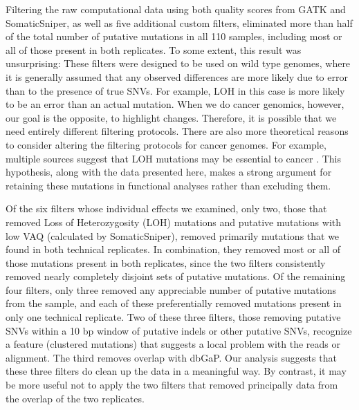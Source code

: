 \documentclass[11 pt]{article} %
\begin{document}
Filtering the raw computational data using both quality scores from GATK and SomaticSniper, as well as five additional custom filters, eliminated more than half of the total number of putative mutations in all 110 samples, including most or all of those present in both replicates. To some extent, this result was unsurprising: These filters were designed to be used on wild type genomes, where it is generally assumed that any observed differences are more likely due to error than to the presence of true SNVs. For example, LOH in this case is more likely to be an error than an actual mutation. When we do cancer genomics, however, our goal is the opposite, to highlight changes. Therefore, it is possible that we need entirely different filtering protocols. There are also more theoretical reasons to consider altering the filtering protocols for cancer genomes. For example, multiple sources suggest that LOH mutations may be essential to cancer \citep{LOH}. This hypothesis, along with the data presented here, makes a strong argument for retaining these mutations in functional analyses rather than excluding them.

Of the six filters whose individual effects we examined, only two, those that removed Loss of Heterozygosity (LOH) mutations and putative mutations with low VAQ (calculated by SomaticSniper), removed primarily mutations that we found in both technical replicates. In combination, they removed most or all of those mutations present in both replicates, since the two filters consistently removed nearly completely disjoint sets of putative mutations. Of the remaining four filters, only three removed any appreciable number of putative mutations from the sample, and each of these preferentially removed mutations present in only one technical replicate. Two of these three filters, those removing putative SNVs within a 10 bp window of putative indels or other putative SNVs, recognize a feature (clustered mutations) that suggests a local problem with the reads or alignment. The third removes overlap with dbGaP.  Our analysis suggests that these three filters do clean up the data in a meaningful way. By contrast, it may be more useful not to apply the two filters that removed principally data from the overlap of the two replicates.
\end{document}
